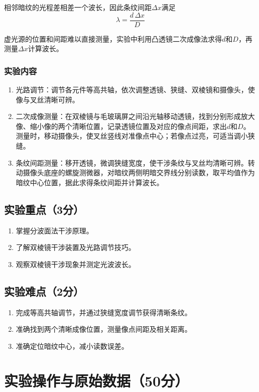 \documentclass[10pt,a4paper]{ctexart} %
\begin{document}
    相邻暗纹的光程差相差一个波长，因此条纹间距\(\Delta x\)满足
    \[
    \lambda=\frac{d\,\Delta x}{D}
    \]
    
    虚光源的位置和间距难以直接测量，实验中利用凸透镜二次成像法求得\(d\)和\(D\)，再测量\(\Delta x\)计算波长。

    \subsubsection{实验内容}
    \begin{enumerate}
      \item 光路调节：调节各元件等高共轴，依次调整透镜、狭缝、双棱镜和摄像头，使像与叉丝清晰可辨。
      \item 二次成像测量：在双棱镜与毛玻璃屏之间沿光轴移动透镜，找到分别形成放大像、缩小像的两个清晰位置，记录透镜位置及对应的像点间距，求出\(d\)和\(D\)。测量时，移动摄像头，使叉丝竖线对准像点中心；若像点过亮，可适当调小狭缝。
      \item 条纹间距测量：移开透镜，微调狭缝宽度，使干涉条纹与叉丝均清晰可辨。转动摄像头底座的螺旋测微器，对暗纹两侧明暗交界线分别读数，取平均值作为暗纹中心位置，据此求得条纹间距并计算波长。
    \end{enumerate}

  \subsection{实验重点（3分）}
  \begin{enumerate}
    \item 掌握分波面法干涉原理。
    \item 了解双棱镜干涉装置及光路调节技巧。
    \item 观察双棱镜干涉现象并测定光波波长。
  \end{enumerate}

  \subsection{实验难点（2分）}
  \begin{enumerate}
    \item 完成等高共轴调节，并通过狭缝宽度调节获得清晰条纹。
    \item 准确找到两个清晰成像位置，测量像点间距及相关距离。
    \item 准确定位暗纹中心，减小读数误差。
  \end{enumerate}

\section{实验操作与原始数据（50分）}
\end{document}
